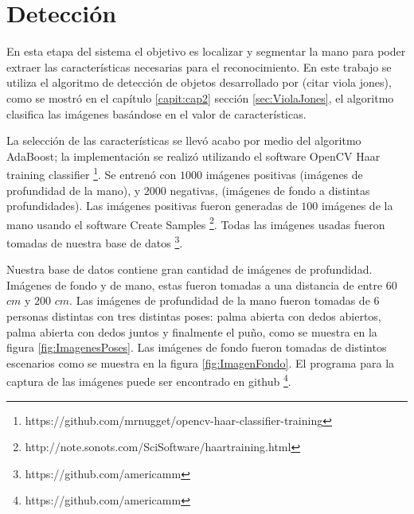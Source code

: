 
\section{Detección}\label{sec:DeteccionSystem} 

En esta etapa del sistema el objetivo es localizar y segmentar la mano para poder extraer las características necesarias para el reconocimiento. 
En este trabajo se utiliza el algoritmo de detección de objetos desarrollado por (citar viola jones), como se mostró en el cap\'itulo \ref{capit:cap2} sección \ref{sec:ViolaJones}, el algoritmo  clasifica las imágenes basándose en el valor de características. 


La selección de las características se llev\'o acabo por medio del algoritmo AdaBoost; la implementaci\'on se realiz\'o utilizando el software OpenCV Haar training classifier \footnote{https://github.com/mrnugget/opencv-haar-classifier-training}. Se entren\'o con $1000$ imágenes positivas (imágenes de profundidad de la mano), y $2000$ negativas, (imágenes de fondo a distintas profundidades). Las imágenes positivas fueron generadas de $100$ imágenes de la mano usando el software Create Samples \footnote{http://note.sonots.com/SciSoftware/haartraining.html}. Todas las imágenes usadas fueron tomadas de nuestra base de  datos \footnote{https://github.com/americamm}.

Nuestra base de datos contiene gran cantidad de imágenes de profundidad. Imágenes de fondo y de mano, estas fueron tomadas a una distancia de entre $60$ $cm$ y $200$ $cm$. Las imágenes de profundidad de la mano fueron tomadas de $6$ personas distintas con tres distintas poses: palma abierta con dedos abiertos, palma abierta con dedos juntos y finalmente el pu\~no, como se muestra en la figura \ref{fig:ImagenesPoses}. Las imágenes de fondo fueron tomadas de distintos escenarios como se muestra en la figura \ref{fig:ImagenFondo}. El programa para la captura de las imágenes puede ser encontrado en github \footnote{https://github.com/americamm}.  

